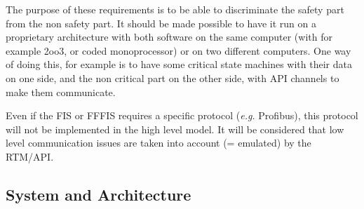 \documentclass{template/openetcs_article}
\begin{document}


\begin{justif}
The purpose of these requirements is to be able to discriminate the safety part from the non 
safety part. It should be made possible to have it run on a proprietary architecture with both 
software on the same computer (with for example 2oo3, or coded monoprocessor) or on two 
different computers. One way of doing this, for example is to have some critical state 
machines with their data on one side, and the non critical part on the other side, with 
API channels to make them communicate.
\end{justif}


\begin{justif}
Even if the FIS or FFFIS requires a specific protocol (\emph{e.g.} Profibus), this protocol will not 
be implemented in the high level model. It will be considered that low level communication issues are
taken into account (= emulated) by the RTM/API.
\end{justif}



\subsection{System and Architecture}
\label{sysarchi}
\end{document}
